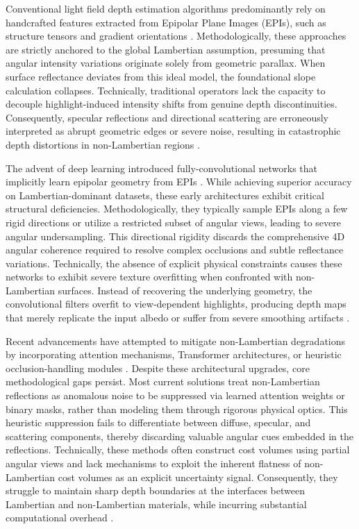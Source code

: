 \documentclass[lettersize,journal]{IEEEtran}
\begin{document}
Conventional light field depth estimation algorithms predominantly rely on handcrafted features extracted from Epipolar Plane Images (EPIs), such as structure tensors and gradient orientations \cite{wanner2014, wang2015}. Methodologically, these approaches are strictly anchored to the global Lambertian assumption, presuming that angular intensity variations originate solely from geometric parallax. When surface reflectance deviates from this ideal model, the foundational slope calculation collapses. Technically, traditional operators lack the capacity to decouple highlight-induced intensity shifts from genuine depth discontinuities. Consequently, specular reflections and directional scattering are erroneously interpreted as abrupt geometric edges or severe noise, resulting in catastrophic depth distortions in non-Lambertian regions \cite{tao2013}.

The advent of deep learning introduced fully-convolutional networks that implicitly learn epipolar geometry from EPIs \cite{heber2018, lyu2022}. While achieving superior accuracy on Lambertian-dominant datasets, these early architectures exhibit critical structural deficiencies. Methodologically, they typically sample EPIs along a few rigid directions or utilize a restricted subset of angular views, leading to severe angular undersampling. This directional rigidity discards the comprehensive 4D angular coherence required to resolve complex occlusions and subtle reflectance variations. Technically, the absence of explicit physical constraints causes these networks to exhibit severe texture overfitting when confronted with non-Lambertian surfaces. Instead of recovering the underlying geometry, the convolutional filters overfit to view-dependent highlights, producing depth maps that merely replicate the input albedo or suffer from severe smoothing artifacts \cite{peng2022}.

Recent advancements have attempted to mitigate non-Lambertian degradations by incorporating attention mechanisms, Transformer architectures, or heuristic occlusion-handling modules \cite{li2021, zhang2023, wang2023}. Despite these architectural upgrades, core methodological gaps persist. Most current solutions treat non-Lambertian reflections as anomalous noise to be suppressed via learned attention weights or binary masks, rather than modeling them through rigorous physical optics. This heuristic suppression fails to differentiate between diffuse, specular, and scattering components, thereby discarding valuable angular cues embedded in the reflections. Technically, these methods often construct cost volumes using partial angular views and lack mechanisms to exploit the inherent flatness of non-Lambertian cost volumes as an explicit uncertainty signal. Consequently, they struggle to maintain sharp depth boundaries at the interfaces between Lambertian and non-Lambertian materials, while incurring substantial computational overhead \cite{li2020}.
\end{document}
